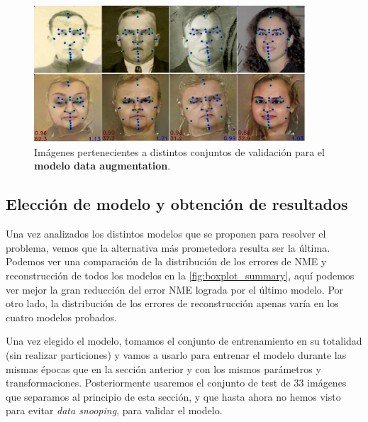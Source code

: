         \begin{figure}[H]
            \centering
            \includegraphics[width=0.9\textwidth]{img/image_daug.png}
            \caption{Imágenes pertenecientes a distintos conjuntos de validación para el \textbf{modelo data augmentation}.}
            \label{fig:Ejemplo_daug}
        \end{figure}

    \subsection{Elección de modelo y obtención de resultados}

        \noindent Una vez analizados los distintos modelos que se proponen para resolver el problema, vemos que la alternativa más prometedora resulta ser la última. Podemos ver una comparación de la distribución de los errores de NME y reconstrucción de todos los modelos en la \autoref{fig:boxplot_summary}, aquí podemos ver mejor la gran reducción del error NME lograda por el último modelo. Por otro lado, la distribución de los errores de reconstrucción apenas varía en los cuatro modelos probados. 
        
        \medskip

        \noindent Una vez elegido el modelo, tomamos el conjunto de entrenamiento en su totalidad (sin realizar particiones) y vamos a usarlo para entrenar el modelo durante las mismas épocas que en la sección anterior y con los mismos parámetros y transformaciones. Posteriormente usaremos el conjunto de test de $33$ imágenes que separamos al principio de esta sección, y que hasta ahora no hemos visto para evitar \textit{data snooping}, para validar el modelo.

